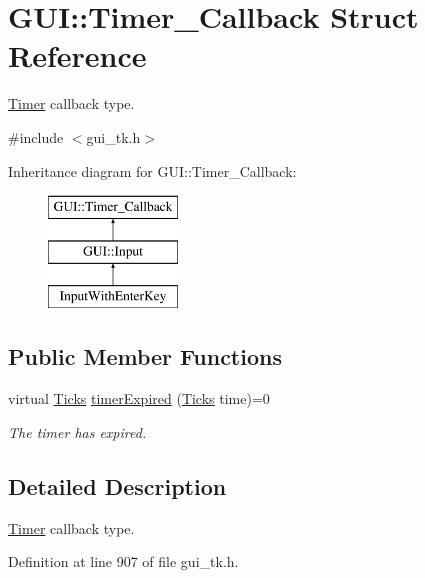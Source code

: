 \hypertarget{structGUI_1_1Timer__Callback}{\section{G\-U\-I\-:\-:Timer\-\_\-\-Callback Struct Reference}
\label{structGUI_1_1Timer__Callback}
}


\hyperlink{classGUI_1_1Timer}{Timer} callback type.  




{\ttfamily \#include $<$gui\-\_\-tk.\-h$>$}

Inheritance diagram for G\-U\-I\-:\-:Timer\-\_\-\-Callback\-:\begin{figure}[H]
\begin{center}
\leavevmode
\includegraphics[height=3.000000cm]{structGUI_1_1Timer__Callback}
\end{center}
\end{figure}
\subsection*{Public Member Functions}
\begin{DoxyCompactItemize}
\item 
virtual \hyperlink{namespaceGUI_af396fee5d5c26b98218f5803f85e3b65}{Ticks} \hyperlink{structGUI_1_1Timer__Callback_a4b5a610f3c4da4acd0bacda97b24e049}{timer\-Expired} (\hyperlink{namespaceGUI_af396fee5d5c26b98218f5803f85e3b65}{Ticks} time)=0
\begin{DoxyCompactList}\small\item\em The timer has expired. \end{DoxyCompactList}\end{DoxyCompactItemize}


\subsection{Detailed Description}
\hyperlink{classGUI_1_1Timer}{Timer} callback type. 

Definition at line 907 of file gui\-\_\-tk.\-h.



